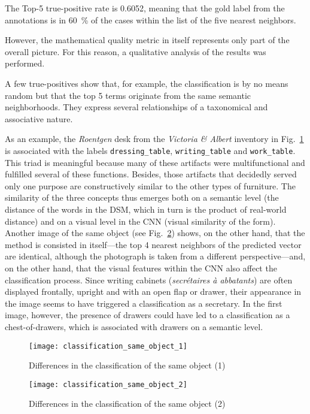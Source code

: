 The Top-5 true-positive rate is \num{0.6052}, meaning that the gold label from the annotations is in \SI{60}{\percent} of the cases within the list of the five nearest neighbors.

However, the mathematical quality metric in itself represents only part of the overall picture. For this reason, a qualitative analysis of the results was performed.

A few true-positives show that, for example, the classification is by no means random but that the top 5 terms originate from the same semantic neighborhoods. They express several relationships of a taxonomical and associative nature.

As an example, the \emph{Roentgen} desk from the \emph{Victoria \& Albert} inventory in Fig.~\ref{fig:classification_same_object_1} is associated with the labels \texttt{dressing\_table}, \texttt{writing\_table} and \texttt{work\_table}. This triad is meaningful because many of these artifacts were multifunctional and fulfilled several of these functions. Besides, those artifacts that decidedly served only one purpose are constructively similar to the other types of furniture. The similarity of the three concepts thus emerges both on a semantic level (the distance of the words in the DSM, which in turn is the product of real-world distance) and on a visual level in the CNN (visual similarity of the form). Another image of the same object (see Fig.~\ref{fig:classification_same_object_2}) shows, on the other hand, that the method is consisted in itself---the top 4 nearest neighbors of the predicted vector are identical, although the photograph is taken from a different perspective---and, on the other hand, that the visual features within the CNN also affect the classification process. Since writing cabinets (\emph{secrétaires à abbatants}) are often displayed frontally, upright and with an open flap or drawer, their appearance in the image seems to have triggered a classification as a secretary. In the first image, however, the presence of drawers could have led to a classification as a chest-of-drawers, which is associated with drawers on a semantic level.

\begin{figure}
    \centering
    \texttt{[image: classification\_same\_object\_1]}
    \caption{Differences in the classification of the same object (1)}
    \label{fig:classification_same_object_1}
\end{figure}

\begin{figure}
    \centering
    \texttt{[image: classification\_same\_object\_2]}
    \caption{Differences in the classification of the same object (2)}
    \label{fig:classification_same_object_2}
\end{figure}


